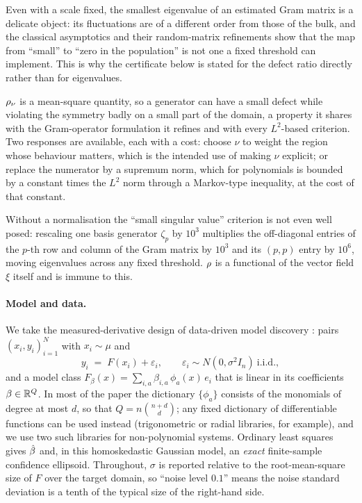 \begin{remark}
Even with a scale fixed, the smallest eigenvalue of an estimated Gram matrix is
a delicate object: its fluctuations are of a different order from those of the
bulk, and the classical asymptotics \citep{anderson1963asymptotic} and their
random-matrix refinements \citep{johnstone2001distribution} show
that the map from ``small'' to ``zero in the population'' is not one a fixed
threshold can implement. This is why the certificate below is stated for the
defect ratio directly rather than for eigenvalues.
\end{remark}

\begin{remark}
$\rho_\nu$ is a mean-square quantity, so a generator can have a small defect
while violating the symmetry badly on a small part of the domain, a property it
shares with the Gram-operator formulation it refines and with every
$L^2$-based criterion. Two responses are available, each with a cost: choose
$\nu$ to weight the region whose behaviour matters, which is the intended use
of making $\nu$ explicit; or replace the numerator by a supremum norm, which
for polynomials is bounded by a constant times the $L^2$ norm through a
Markov-type inequality, at the cost of that constant.
\end{remark}

Without a normalisation the ``small singular value'' criterion is not even well
posed: rescaling one basis generator $\zeta_p$ by $10^{3}$ multiplies the
off-diagonal entries of the $p$-th row and column of the Gram matrix by
$10^{3}$ and its $(p,p)$ entry by $10^{6}$, moving eigenvalues across any fixed
threshold. $\rho$ is a functional of the
vector field $\xi$ itself and is immune to this.

\paragraph{Model and data.} We take the measured-derivative design of
data-driven model discovery \citep{brunton2016discovering}: pairs
$(x_i, y_i)_{i=1}^N$ with $x_i \sim \mu$ and
\begin{equation}
  y_i \;=\; F(x_i) + \varepsilon_i , \qquad \varepsilon_i \sim N(0, \sigma^2 I_n)
  \ \text{i.i.d.},
  \label{eq:model}
\end{equation}
and a model class $F_\beta(x) = \sum_{i,a} \beta_{i,a}\, \phi_a(x)\, e_i$ that is
linear in its coefficients $\beta \in \mathbb{R}^Q$. In most of the paper the
dictionary $\{\phi_a\}$ consists of the monomials of degree at most $d$, so
that $Q = n\binom{n+d}{d}$; any fixed dictionary of differentiable functions
can be used instead (trigonometric or radial libraries, for example), and we
use two such libraries for non-polynomial systems. Ordinary least squares
gives $\hat{\beta}$ and, in this homoskedastic Gaussian model, an \emph{exact}
finite-sample confidence ellipsoid. Throughout, $\sigma$ is reported relative
to the root-mean-square size of $F$ over the target domain, so ``noise level
$0.1$'' means the noise standard deviation is a tenth of the typical size of
the right-hand side.

